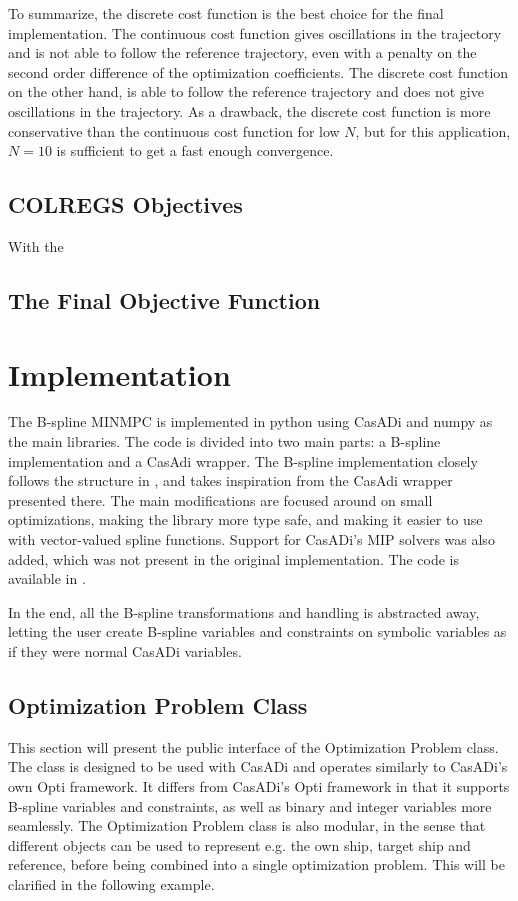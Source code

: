 \FloatBarrier
To summarize, the discrete cost function is the best choice for the final implementation. The continuous cost function gives oscillations in the trajectory and is not able to follow the reference trajectory, even with a penalty on the second order difference of the optimization coefficients. The discrete cost function on the other hand, is able to follow the reference trajectory and does not give oscillations in the trajectory. As a drawback, the discrete cost function is more conservative than the continuous cost function for low $N$, but for this application, $N=10$ is sufficient to get a fast enough convergence.


\subsection{COLREGS Objectives}

With the 

\subsection{The Final Objective Function}


\section{Implementation}\label{sec:python-implementation}

The B-spline MINMPC is implemented in python using CasADi \citep{casadi} and numpy \citep{numpy} as the main libraries. The code is divided into two main parts: a B-spline implementation and a CasAdi wrapper. 
The B-spline implementation closely follows the structure in \citet{mercy2016spline}, and takes inspiration from the CasAdi wrapper presented there. The main modifications are focused around on small optimizations, making the library more type safe, and making it easier to use with vector-valued spline functions. Support for CasADi's MIP solvers was also added, which was not present in the original implementation. 
The code is available in .

In the end, all the B-spline transformations and handling is abstracted away, letting the user create B-spline variables and constraints on symbolic variables as if they were normal CasADi variables. 

\subsection{Optimization Problem Class}
This section will present the public interface of the Optimization Problem class. The class is designed to be used with CasADi and operates similarly to CasADi's own Opti framework. It differs from CasADi's Opti framework in that it supports B-spline variables and constraints, as well as binary and integer variables more seamlessly. The Optimization Problem class is also modular, in the sense that different objects can be used to represent e.g. the own ship, target ship and reference, before being combined into a single optimization problem. This will be clarified in the following example.

